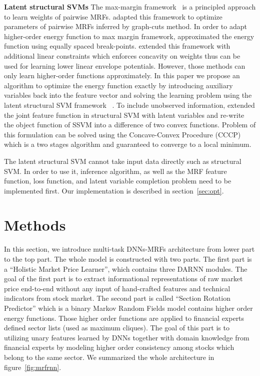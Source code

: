 \documentclass[sigconf,anonymous,review]{acmart}
\renewcommand{\citename}{\citet}
\renewcommand{\cite}{\citep}
\begin{document}
\textbf{Latent structural SVMs} The max-margin
framework~\cite{Taskar:ICML05,tsochantaridis2005large} is a
principled approach to learn weights of pairwise MRFs.
\citename{Szummer:ECCV08} adapted this framework to optimize
parameters of pairwise MRFs inferred by graph-cuts method. In
order to adapt higher-order energy function to max margin
framework, \citename{Gould:ICML2011} approximated the energy
function using equally spaced break-points.
\citename{gouldlearning} extended this framework with additional
linear constraints which enforces concavity on weights thus can
be used for learning lower linear envelope potentials. However,
those methods can only learn higher-order functions
approximately. In this paper we propose an algorithm to optimize
the energy function exactly by introducing auxiliary variables
back into the feature vector and solving the learning problem
using the latent structural SVM framework
~\cite{yu2009learning}. To include unobserved information,
\citename{yu2009learning} extended the joint feature function in
structural SVM with latent variables and re-write the object
function of SSVM into a difference of two convex functions.
Problem of this formulation can be solved using the
Concave-Convex Procedure (CCCP)\cite{yuille2002concave} which is
a two stages algorithm and guaranteed to converge to a local
minimum.


The latent structural SVM cannot take input data directly such
as structural SVM. In order to use it, inference algorithm, as
well as the MRF feature function, loss function, and latent
variable completion problem\cite{yu2009learning} need to be
implemented first. Our implementation is described in
section~\ref{sec:opt}.

\section{Methods}
\label{sec:meth}

In this section, we introduce multi-task DNNs-MRFs architecture
from lower part to the top part. The whole model is constructed
with two parts. The first part is a ``Holistic Market Price
Learner'', which contains three DARNN modules. The goal of the
first part is to extract informational representations of raw
market price end-to-end without any input of hand-crafted
features and technical indicators from stock market. The second
part is called ``Section Rotation Predictor'' which is a binary
Markov Random Fields model contains higher order energy
functions. Those higher order functions are applied to financial
experts defined sector lists (used as maximum cliques). The goal
of this part is to utilizing unary features learned by DNNs
together with domain knowledge from financial experts by modeling
higher order consistency among stocks which belong to the same
sector. We summarized the whole architecture in
figure~\ref{fig:mrfrnn}.
\end{document}
